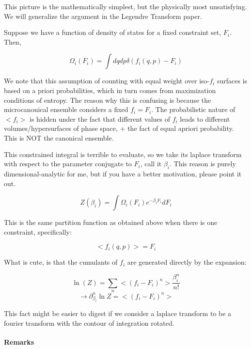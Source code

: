 \documentclass[12pt]{article}
\begin{document}
This picture is the mathematically simplest, but the physically most unsatisfying.  We will generalize the argument in the Legendre Transform paper. 

Suppose we have a function of density of states for a fixed constraint set, $F_i$.  Then,

$$\Omega_i(F_i)= \int dqdp  \delta(f_i(q,p)- F_i)$$

We note that this assumption of counting with equal weight over iso-$f_i$ surfaces is based on a priori probabilities, which in turn comes from maximization conditions of entropy.  The reason why this is confusing is because the microcanonical ensemble considers a fixed $f_i= F_i$.  The probabilistic nature of $<f_i>$ is hidden under the fact that different values of $f_i$ leads to different volumes/hypersurfaces of phase space, + the fact of equal apriori probability. This is NOT the canonical ensemble.

This constrained integral is terrible to evaluate, so we take its laplace transform with respect to the parameter conjugate to $F_i$, call it $\beta_i$. This reason is purely dimensional-analytic for me, but if you have a better motivation, please point it out.

$$Z(\beta_i) = \int \Omega_i(F_i) e^{- \beta_i F_i} dF_i$$

This is the same partition function as obtained above when there is one constraint, specifically:

$$<f_i (q,p)>= F_i$$

What is cute, is that the cumulants of $f_i$ are generated directly by the expansion:

$$\ln(Z)= \sum_n<(f_i- F_i)^n> \frac{\beta_i^n}{n!}$$
$$\rightarrow \partial_{\beta_i}^n \ln Z = <(f_i- F_i)^n>$$

This fact might be easier to digest if we consider a laplace transform to be a fourier transform with the contour of integration rotated.

\paragraph{Remarks}
\end{document}
